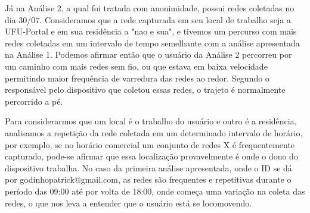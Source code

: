 \documentclass[12pt, %
openright, 
oneside,
a4paper,
brazil]{facom-ufu-abntex2}
\begin{document}
Já na Análise 2, a qual foi tratada com anonimidade, possui redes coletadas no dia 30/07. Consideramos que a rede capturada em seu local de trabalho seja a UFU-Portal e em sua residência a "nao e sua", e tivemos um percurso com mais redes coletadas em um intervalo de tempo semelhante com a análise apresentada na Análise 1. Podemos afirmar então que o usuário da Análise 2 percorreu por um caminho com mais redes sem fio, ou que estava em baixa velocidade permitindo maior frequência de varredura das redes ao redor. Segundo o responsável pelo dispositivo que coletou essas redes, o trajeto é normalmente percorrido a pé.


Para considerarmos que um local é o trabalho do usuário e outro é a residência, analisamos a repetição da rede coletada em um determinado intervalo de horário, por exemplo, se no horário comercial um conjunto de redes X é frequentemente capturado, pode-se afirmar que essa localização provavelmente é onde o dono do dispositivo trabalha. No caso da primeira análise apresentada, onde o ID se dá por godinhopatrick@gmail.com, as redes são frequentes e repetitivas durante o período das 09:00 até por volta de 18:00, onde começa uma variação na coleta das redes, o que nos leva a entender que o usuário está se locomovendo.
\end{document}

